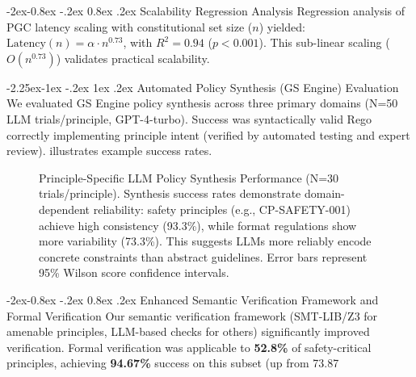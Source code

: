 \documentclass[manuscript,screen,9pt]{acmart}
\makeatletter
\renewcommand\subsection{\@startsection{subsection}{2}{\z@}%
  {-2.25ex\@plus -1ex \@minus -.2ex}%
  {1ex \@plus .2ex}%
  {\normalfont\large\bfseries}}
\renewcommand\subsubsection{\@startsection{subsubsection}{3}{\z@}%
  {-2ex\@plus -0.8ex \@minus -.2ex}%
  {0.8ex \@plus .2ex}%
  {\normalfont\normalsize\bfseries}}
\makeatother
\begin{document}
\subsubsection{Scalability Regression Analysis}
\label{subsubsec:scalability_regression_analysis}
Regression analysis of PGC latency scaling with constitutional set size ($n$) yielded: $\text{Latency}(n) = \alpha \cdot n^{0.73}$, with $R^2 = 0.94$ ($p < 0.001$). This sub-linear scaling ($O(n^{0.73})$) validates practical scalability.

\subsection{Automated Policy Synthesis (GS Engine) Evaluation}
\label{sec:synthesis_evaluation}
We evaluated GS Engine policy synthesis across three primary domains (N=50 LLM trials/principle, GPT-4-turbo). Success was syntactically valid Rego correctly implementing principle intent (verified by automated testing and expert review).  illustrates example success rates.

\FloatBarrier %
\begin{figure}[!htb]
\centering
\caption[Principle-Specific LLM Policy Synthesis Performance]{Principle-Specific LLM Policy Synthesis Performance (N=30 trials/principle). Synthesis success rates demonstrate domain-dependent reliability: safety principles (e.g., CP-SAFETY-001) achieve high consistency (93.3\%), while format regulations show more variability (73.3\%). This suggests LLMs more reliably encode concrete constraints than abstract guidelines. Error bars represent 95\% Wilson score confidence intervals.}
\label{fig:rule_synthesis_chart}
\end{figure}

\subsubsection{Enhanced Semantic Verification Framework and Formal Verification}
\label{subsubsec:enhanced_verification}
Our semantic verification framework (SMT-LIB/Z3 for amenable principles, LLM-based checks for others) significantly improved verification. Formal verification was applicable to \textbf{52.8\%} of safety-critical principles, achieving \textbf{94.67\%} success on this subset (up from 73.87%
\end{document}
